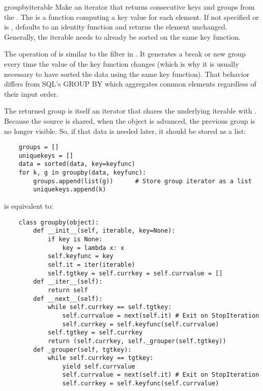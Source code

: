 \begin{funcdesc}{groupby}{iterable}
  Make an iterator that returns consecutive keys and groups from the
  . The  is a function computing a key value for each
  element.  If not specified or is ,  defaults to an
  identity function and returns  the element unchanged.  Generally, the
  iterable needs to already be sorted on the same key function.

  The operation of  is similar to the  filter
  in \UNIX{}.  It generates a break or new group every time the value
  of the key function changes (which is why it is usually necessary
  to have sorted the data using the same key function).  That behavior
  differs from SQL's GROUP BY which aggregates common elements regardless
  of their input order.

  The returned group is itself an iterator that shares the underlying
  iterable with .  Because the source is shared, when
  the  object is advanced, the previous group is no
  longer visible.  So, if that data is needed later, it should be stored
  as a list:

  \begin{verbatim}
    groups = []
    uniquekeys = []
    data = sorted(data, key=keyfunc)
    for k, g in groupby(data, keyfunc):
        groups.append(list(g))      # Store group iterator as a list
        uniquekeys.append(k)
  \end{verbatim}

   is equivalent to:

  \begin{verbatim}
    class groupby(object):
        def __init__(self, iterable, key=None):
            if key is None:
                key = lambda x: x
            self.keyfunc = key
            self.it = iter(iterable)
            self.tgtkey = self.currkey = self.currvalue = []
        def __iter__(self):
            return self
        def __next__(self):
            while self.currkey == self.tgtkey:
                self.currvalue = next(self.it) # Exit on StopIteration
                self.currkey = self.keyfunc(self.currvalue)
            self.tgtkey = self.currkey
            return (self.currkey, self._grouper(self.tgtkey))
        def _grouper(self, tgtkey):
            while self.currkey == tgtkey:
                yield self.currvalue
                self.currvalue = next(self.it) # Exit on StopIteration
                self.currkey = self.keyfunc(self.currvalue)
  \end{verbatim}
\end{funcdesc}

